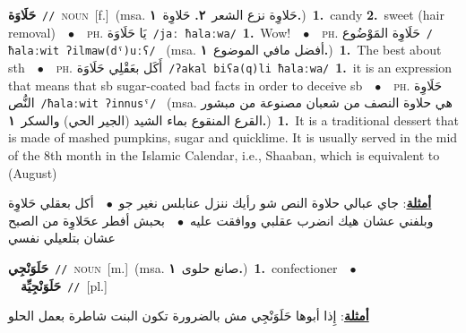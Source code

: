 \documentclass[10pt,a4paper,twoside]{article} %
\begin{document}
\begin{multicols}{2}
{\setlength\topsep{0pt}\textbf{\foreignlanguage{arabic}{حَلَاوَة}}\ {\color{gray}\texttt{//}\color{black}}\ \textsc{noun}\ [f.]\ \color{gray}(msa. \foreignlanguage{arabic}{حَلاوِة نزع الشعر}~\foreignlanguage{arabic}{\textbf{٢.}}  \foreignlanguage{arabic}{حَلاوِة}~\foreignlanguage{arabic}{\textbf{١.}})\color{black}\ \textbf{1.}~candy  \textbf{2.}~sweet (hair removal)\ \ $\bullet$\ \ \textsc{ph.} \color{gray} \foreignlanguage{arabic}{يَا حَلَاوَة}\color{black}\ {\color{gray}\texttt{/{\sffamily jaː ħalaːwa}/}\color{black}}\ \textbf{1.}~Wow!\ \ $\bullet$\ \ \textsc{ph.} \color{gray} \foreignlanguage{arabic}{حَلَاوِة المَوْضُوع}\color{black}\ {\color{gray}\texttt{/{\sffamily ħalaːwit ʔilmaw(dˤ)uːʕ}/}\color{black}}\ \color{gray} (msa. \foreignlanguage{arabic}{أفضل مافي الموضوع}~\foreignlanguage{arabic}{\textbf{١.}})\color{black}\ \textbf{1.}~The best about sth\ \ $\bullet$\ \ \textsc{ph.} \color{gray} \foreignlanguage{arabic}{أَكَل بعَقْلِي حَلَاوَة}\color{black}\ {\color{gray}\texttt{/{\sffamily ʔakal biʕa(q)li ħalaːwa}/}\color{black}}\ \textbf{1.}~it is an expression that means that sb sugar-coated bad facts in order to deceive sb\ \ $\bullet$\ \ \textsc{ph.} \color{gray} \foreignlanguage{arabic}{حَلَاوِة النُّص}\color{black}\ {\color{gray}\texttt{/{\sffamily ħalaːwit ʔinnusˤ}/}\color{black}}\ \color{gray} (msa. \foreignlanguage{arabic}{هي حلاوة النصف من شعبان مصنوعة من مبشور القرع المنقوع بماء الشيد (الجير الحي) والسكر}~\foreignlanguage{arabic}{\textbf{١.}})\color{black}\ \textbf{1.}~It is a traditional dessert that is made of mashed pumpkins, sugar and quicklime. It is usually served in the mid of the 8th month in the Islamic Calendar, i.e., Shaaban, which is equivalent to (August)\  \begin{flushright}\color{gray}\foreignlanguage{arabic}{\textbf{\underline{\foreignlanguage{arabic}{أمثلة}}}: جاي عبالي حلاوة النص شو رأيك ننزل عنابلس نغير جو\ $\bullet$\ \  أكل بعقلي حَلاوِة وبلفني عشان هيك انضرب عقلبي ووافقت عليه\ $\bullet$\ \  بحبش أفطر عحَلاوِة من الصبح عشان بتلعيلي نفسي}\end{flushright}\color{black}} \vspace{2mm}

{\setlength\topsep{0pt}\textbf{\foreignlanguage{arabic}{حَلَوَنْجِي}}\ {\color{gray}\texttt{//}\color{black}}\ \textsc{noun}\ [m.]\ \color{gray}(msa. \foreignlanguage{arabic}{صانع حلوى}~\foreignlanguage{arabic}{\textbf{١.}})\color{black}\ \textbf{1.}~confectioner\ \ $\bullet$\ \ \setlength\topsep{0pt}\textbf{\foreignlanguage{arabic}{حَلَوَنْجِيِّة}}\ {\color{gray}\texttt{//}\color{black}}\ [pl.]\  \begin{flushright}\color{gray}\foreignlanguage{arabic}{\textbf{\underline{\foreignlanguage{arabic}{أمثلة}}}: إِذا أبوها حَلَوَنْجِي مش بالضرورة تكون البنت شاطرة بعمل الحلو}\end{flushright}\color{black}} \vspace{2mm}


\end{multicols}
\end{document}
